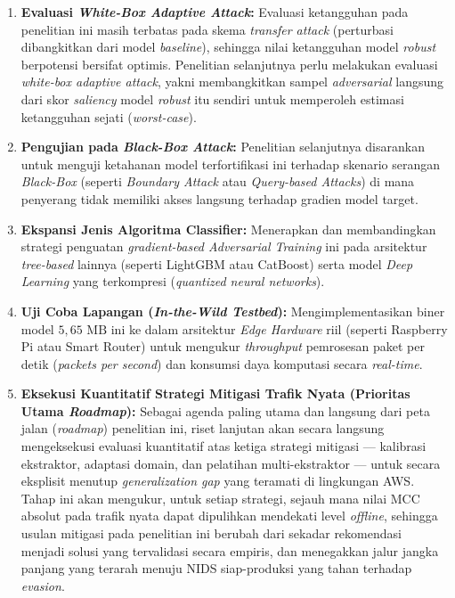 \documentclass[11pt, a4paper]{article}
\begin{document}
\begin{enumerate}
    \item \textbf{Evaluasi \textit{White-Box Adaptive Attack}:} Evaluasi ketangguhan pada penelitian ini masih terbatas pada skema \textit{transfer attack} (perturbasi dibangkitkan dari model \textit{baseline}), sehingga nilai ketangguhan model \textit{robust} berpotensi bersifat optimis. Penelitian selanjutnya perlu melakukan evaluasi \textit{white-box adaptive attack}, yakni membangkitkan sampel \textit{adversarial} langsung dari skor \textit{saliency} model \textit{robust} itu sendiri untuk memperoleh estimasi ketangguhan sejati (\textit{worst-case}).

    \item \textbf{Pengujian pada \textit{Black-Box Attack}:} Penelitian selanjutnya disarankan untuk menguji ketahanan model terfortifikasi ini terhadap skenario serangan \textit{Black-Box} (seperti \textit{Boundary Attack} atau \textit{Query-based Attacks}) di mana penyerang tidak memiliki akses langsung terhadap gradien model target.
    
    \item \textbf{Ekspansi Jenis Algoritma Classifier:} Menerapkan dan membandingkan strategi penguatan \textit{gradient-based Adversarial Training} ini pada arsitektur \textit{tree-based} lainnya (seperti LightGBM atau CatBoost) serta model \textit{Deep Learning} yang terkompresi (\textit{quantized neural networks}).

    \item \textbf{Uji Coba Lapangan (\textit{In-the-Wild Testbed}):} Mengimplementasikan biner model $5{,}65\text{ MB}$ ini ke dalam arsitektur \textit{Edge Hardware} riil (seperti Raspberry Pi atau Smart Router) untuk mengukur \textit{throughput} pemrosesan paket per detik (\textit{packets per second}) dan konsumsi daya komputasi secara \textit{real-time}.

    \item \textbf{Eksekusi Kuantitatif Strategi Mitigasi Trafik Nyata (Prioritas Utama \textit{Roadmap}):} Sebagai agenda paling utama dan langsung dari peta jalan (\textit{roadmap}) penelitian ini, riset lanjutan akan secara langsung mengeksekusi evaluasi kuantitatif atas ketiga strategi mitigasi --- kalibrasi ekstraktor, adaptasi domain, dan pelatihan multi-ekstraktor --- untuk secara eksplisit menutup \textit{generalization gap} yang teramati di lingkungan AWS. Tahap ini akan mengukur, untuk setiap strategi, sejauh mana nilai MCC absolut pada trafik nyata dapat dipulihkan mendekati level \textit{offline}, sehingga usulan mitigasi pada penelitian ini berubah dari sekadar rekomendasi menjadi solusi yang tervalidasi secara empiris, dan menegakkan jalur jangka panjang yang terarah menuju NIDS siap-produksi yang tahan terhadap \textit{evasion}.
\end{enumerate}
\end{document}

